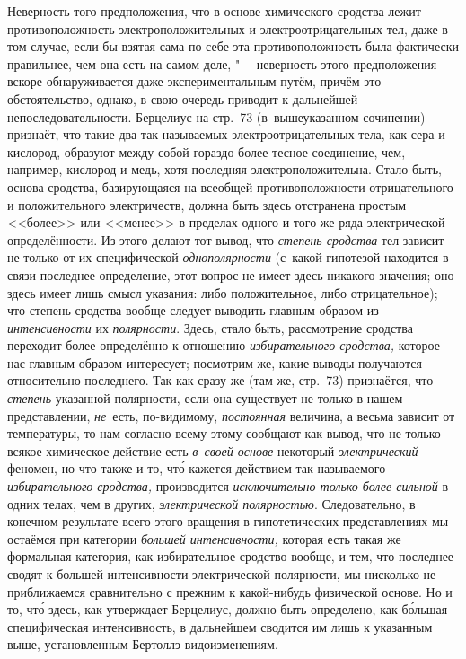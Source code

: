 Неверность того предположения, что в основе химического сродства лежит
противоположность электроположительных и электроотрицательных тел, даже в том
случае, если бы взятая сама по себе эта противоположность была фактически
правильнее, чем она есть на самом деле, "--- неверность этого предположения
вскоре обнаруживается даже экспериментальным путём, причём это обстоятельство,
однако, в свою очередь приводит к дальнейшей непоследовательности. Берцелиус на
стр.~73 (в~вышеуказанном сочинении) признаёт, что такие два так называемых
электроотрицательных тела, как сера и кислород, образуют между собой гораздо
более тесное соединение, чем, например, кислород и медь, хотя последняя
электроположительна. Стало быть, основа сродства, базирующаяся на всеобщей
противоположности отрицательного и положительного электричеств, должна быть
здесь отстранена простым <<более>> или <<менее>> в пределах
одного и того же ряда электрической определённости. Из этого делают тот вывод,
что {\em степень сродства} тел зависит не только от их специфической
{\em однополярности} (с~какой гипотезой находится в связи последнее
определение, этот вопрос не имеет здесь никакого значения; оно здесь имеет лишь
смысл указания: либо положительное, либо отрицательное); что
степень сродства вообще следует выводить главным образом из {\em интенсивности} их
{\em полярности}. Здесь, стало быть, рассмотрение сродства переходит
более определённо к отношению {\em избирательного сродства,} которое нас
главным образом интересует; посмотрим же, какие выводы получаются относительно
последнего. Так как сразу же (там же, стр.~73) признаётся, что {\em степень}
указанной полярности, если она существует не только в нашем представлении,
{\em не}~есть, по-видимому, {\em постоянная} величина, а весьма зависит от
температуры, то нам согласно всему этому сообщают как вывод, что не только
всякое химическое действие есть {\em в~своей основе} некоторый
{\em электрический} феномен, но что также и то, чт\'{о} кажется действием так
называемого {\em избирательного сродства,} производится
{\em исключительно только более сильной} в одних телах, чем в других,
{\em электрической полярностью}. Следовательно, в конечном результате всего этого
вращения в гипотетических представлениях мы остаёмся при категории
{\em большей интенсивности,} которая есть такая же формальная категория,
как избирательное сродство вообще, и тем, что последнее сводят к большей
интенсивности электрической полярности, мы нисколько не приближаемся сравнительно
с прежним к какой-нибудь физической основе. Но и то, чт\'{о} здесь, как
утверждает Берцелиус, должно быть определено, как б\'{о}льшая специфическая
интенсивность, в дальнейшем сводится им лишь к указанным выше, установленным
Бертоллэ видоизменениям.

